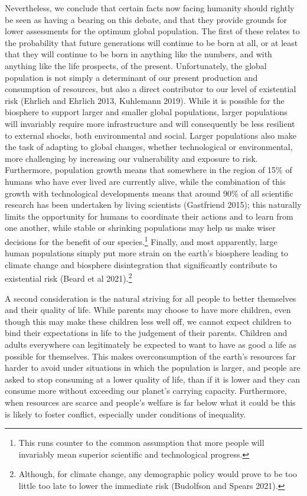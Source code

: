 \documentclass[man,11pt,a4paper,floatsintext]{apa7}
\begin{document}
Nevertheless, we conclude that certain facts now facing humanity should rightly be seen as having a bearing on this debate, and that they provide grounds for lower assessments for the optimum global population. The first of these relates to the probability that future generations will continue to be born at all, or at least that they will continue to be born in anything like the numbers, and with anything like the life prospects, of the present. Unfortunately, the global population is not simply a determinant of our present production and consumption of resources, but also a direct contributor to our level of existential risk (Ehrlich and Ehrlich 2013, Kuhlemann 2019). While it is possible for the biosphere to support larger and smaller global populations, larger populations will invariably require more infrastructure and will consequently be less resilient to external shocks, both environmental and social. Larger populations also make the task of adapting to global changes, whether technological or environmental, more challenging by increasing our vulnerability and exposure to risk. Furthermore, population growth means that somewhere in the region of 15\% of humans who have ever lived are currently alive, while the combination of this growth with technological developments means that around 90\% of all scientific research has been undertaken by living scientists (Gastfriend 2015); this naturally limits the opportunity for humans to coordinate their actions and to learn from one another, while stable or shrinking populations may help us make wiser decisions for the benefit of our species.\footnote{This runs counter to the common assumption that more people will invariably mean superior scientific and technological progress.} Finally, and most apparently, large human populations simply put more strain on the earth's biosphere leading to climate change and biosphere disintegration that significantly contribute to existential risk (Beard et al 2021).\footnote{Although, for climate change, any demographic policy would prove to be too little too late to lower the immediate risk (Budolfson and Spears 2021).}

A second consideration is the natural striving for all people to better themselves and their quality of life. While parents may choose to have more children, even though this may make these children less well off, we cannot expect children to bind their expectations in life to the judgement of their parents. Children and adults everywhere can legitimately be expected to want to have as good a life as possible for themselves. This makes overconsumption of the earth's resources far harder to avoid under situations in which the population is larger, and people are asked to stop consuming at a lower quality of life, than if it is lower and they can consume more without exceeding our planet's carrying capacity. Furthermore, when resources are scarce and people's welfare is far below what it could be this is likely to foster conflict, especially under conditions of inequality.
\end{document}
